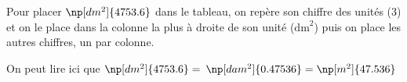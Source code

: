 \documentclass{classe-tex3R}
\begin{document}


\begin{exemple}
Pour placer $\np[dm^2]{4753.6}$ dans le tableau, on repère son chiffre des unités (3) et on le place dans la colonne la plus à droite de son unité ($\mathrm{dm}^2$) puis on place les autres chiffres, un par colonne.

\vspace{0.5em}


\vspace{1em}

    On peut lire ici que $\np[dm^2]{4753.6} =$ $ \np[dam^2]{0.47536} = \np[m^2]{47.536}$

\end{exemple}
\end{document}
